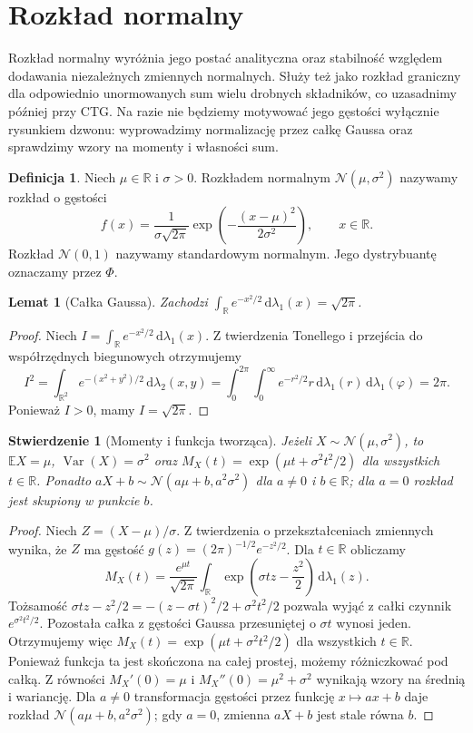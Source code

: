 \documentclass[11pt,a4paper,oneside]{report}
\numberwithin{equation}{chapter}
\theoremstyle{plain}
\newtheorem{lemat}[twierdzenie]{Lemat}
\newtheorem{stwierdzenie}[twierdzenie]{Stwierdzenie}
\theoremstyle{definition}
\newtheorem{definicja}{Definicja}[chapter]
\theoremstyle{remark}
\newcommand{\R}{\mathbb{R}}
\newcommand{\E}{\mathbb{E}}
\newcommand{\Var}{\operatorname{Var}}
\newcommand{\dd}{\mathrm{d}}
\newcommand{\Normal}{\mathcal{N}}
\begin{document}
\section{Rozkład normalny}
Rozkład normalny wyróżnia jego postać analityczna oraz stabilność
względem dodawania niezależnych zmiennych normalnych. Służy też
jako rozkład graniczny dla odpowiednio unormowanych sum
wielu drobnych składników, co uzasadnimy później przy CTG.
Na razie nie będziemy motywować jego gęstości wyłącznie
rysunkiem dzwonu: wyprowadzimy normalizację przez całkę Gaussa
oraz sprawdzimy wzory na momenty i własności sum.

\begin{definicja}
Niech $\mu\in\R$ i $\sigma>0$. Rozkładem normalnym
$\Normal(\mu,\sigma^2)$ nazywamy rozkład o gęstości
\begin{equation}\label{eq:normal}
f(x)=\frac{1}{\sigma\sqrt{2\pi}}
\exp\!\left(-\frac{(x-\mu)^2}{2\sigma^2}\right),
\qquad x\in\R.
\end{equation}
Rozkład $\Normal(0,1)$ nazywamy standardowym normalnym.
Jego dystrybuantę oznaczamy przez $\Phi$.
\end{definicja}

\begin{lemat}[Całka Gaussa]
Zachodzi $\int_\R e^{-x^2/2}\,\dd\lambda_1(x)=\sqrt{2\pi}$.
\end{lemat}
\begin{proof}
Niech $I=\int_\R e^{-x^2/2}\,\dd\lambda_1(x)$.
Z twierdzenia Tonellego i przejścia do współrzędnych biegunowych
otrzymujemy
\[
I^2=\int_{\R^2}e^{-(x^2+y^2)/2}\,\dd\lambda_2(x,y)
=\int_0^{2\pi}\!\int_0^\infty e^{-r^2/2}r\,
\dd\lambda_1(r)\,\dd\lambda_1(\varphi)=2\pi.
\]
Ponieważ $I>0$, mamy $I=\sqrt{2\pi}$.
\end{proof}

\begin{stwierdzenie}[Momenty i funkcja tworząca]
Jeżeli $X\sim\Normal(\mu,\sigma^2)$, to
$\E X=\mu$, $\Var(X)=\sigma^2$ oraz
$M_X(t)=\exp(\mu t+\sigma^2t^2/2)$ dla wszystkich $t\in\R$.
Ponadto $aX+b\sim\Normal(a\mu+b,a^2\sigma^2)$
dla $a\ne0$ i $b\in\R$; dla $a=0$ rozkład jest skupiony
w punkcie $b$.
\end{stwierdzenie}
\begin{proof}
Niech $Z=(X-\mu)/\sigma$. Z twierdzenia o
przekształceniach zmiennych wynika, że $Z$ ma gęstość
$g(z)=(2\pi)^{-1/2}e^{-z^2/2}$.
Dla $t\in\R$ obliczamy
\[
M_X(t)=\frac{e^{\mu t}}{\sqrt{2\pi}}\int_\R
\exp\!\left(\sigma tz-\frac{z^2}2\right)
\,\dd\lambda_1(z).
\]
Tożsamość
$\sigma tz-z^2/2=-(z-\sigma t)^2/2+\sigma^2t^2/2$
pozwala wyjąć z całki czynnik
$e^{\sigma^2t^2/2}$. Pozostała całka z gęstości
Gaussa przesuniętej o $\sigma t$ wynosi jeden.
Otrzymujemy więc
$M_X(t)=\exp(\mu t+\sigma^2t^2/2)$
dla wszystkich $t\in\R$.
Ponieważ funkcja ta jest skończona na całej prostej,
możemy różniczkować pod całką. Z równości
$M_X'(0)=\mu$ i $M_X''(0)=\mu^2+\sigma^2$
wynikają wzory na średnią i wariancję.
Dla $a\ne0$ transformacja gęstości przez funkcję
$x\mapsto ax+b$ daje rozkład
$\Normal(a\mu+b,a^2\sigma^2)$;
gdy $a=0$, zmienna $aX+b$ jest stale równa $b$.
\end{proof}
\end{document}
